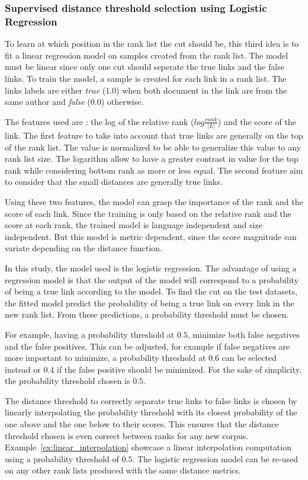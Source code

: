 \subsubsection{Supervised distance threshold selection using Logistic Regression}

To learn at which position in the rank list the cut should be, this third idea is to fit a linear regression model on samples created from the rank list.
The model must be linear since only one cut should seperate the true links and the false links.
To train the model, a sample is created for each link in a rank list.
The links labels are either \textit{true} (1.0) when both document in the link are from the same author and \textit{false} (0.0) otherwise.

The features used are : the log of the relative rank ($log \frac{rank}{|L|}$) and the score of the link.
The first feature to take into account that true links are generally on the top of the rank list.
The value is normalized to be able to generalize this value to any rank list size.
The logarithm allow to have a greater contrast in value for the top rank while considering bottom rank as more or less equal.
The second feature aim to consider that the small distances are generally true links.

Using these two features, the model can grasp the importance of the rank and the score of each link.
Since the training is only based on the relative rank and the score at each rank, the trained model is language independent and size independent.
But this model is metric dependent, since the score magnitude can variate depending on the distance function.

In this study, the model used is the logistic regression.
The advantage of using a regression model is that the output of the model will correspond to a probability of being a true link according to the model.
To find the cut on the test datasets, the fitted model predict the probability of being a true link on every link in the new rank list.
From these predictions, a probability threshold must be chosen.

For example, having a probability threshold at $0.5$, minimize both false negatives and the false positives.
This can be adjusted, for example if false negatives are more important to minimize, a probability threshold at $0.6$ can be selected instead or $0.4$ if the false positive should be minimized.
For the sake of simplicity, the probability threshold chosen is $0.5$.

The distance threshold to correctly separate true links to false links is chosen by linearly interpolating the probability threshold with its closest probability of the one above and the one below to their scores.
This ensures that the distance threshold chosen is even correct between ranks for any new corpus.
Example~\ref{ex:linear_interpolation} showcase a linear interpolation computation using a probability threshold of $0.5$.
The logistic regression model can be re-used on any other rank lists produced with the same distance metrics.

